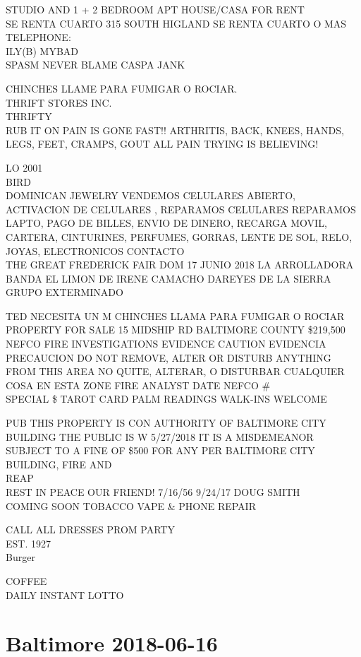 \documentclass[10pt,letterpaper]{article}
\begin{document}
STUDIO AND 1 + 2 BEDROOM APT HOUSE/CASA FOR RENT\\
SE RENTA CUARTO 315 SOUTH HIGLAND SE RENTA CUARTO O MAS TELEPHONE:\\
ILY(B) MYBAD\\
SPASM NEVER BLAME CASPA JANK

CHINCHES LLAME PARA FUMIGAR O ROCIAR.\\
THRIFT STORES INC.\\
THRIFTY\\
RUB IT ON PAIN IS GONE FAST!! ARTHRITIS, BACK, KNEES, HANDS, LEGS, FEET, CRAMPS, GOUT ALL PAIN TRYING IS BELIEVING!

LO 2001\\
BIRD\\
DOMINICAN JEWELRY VENDEMOS CELULARES ABIERTO, ACTIVACION DE CELULARES , REPARAMOS CELULARES REPARAMOS LAPTO, PAGO DE BILLES, ENVIO DE DINERO, RECARGA MOVIL, CARTERA, CINTURINES, PERFUMES, GORRAS, LENTE DE SOL, RELO, JOYAS, ELECTRONICOS CONTACTO\\
THE GREAT FREDERICK FAIR DOM 17 JUNIO 2018 LA ARROLLADORA BANDA EL LIMON DE IRENE CAMACHO DAREYES DE LA SIERRA GRUPO EXTERMINADO

TED NECESITA UN M CHINCHES LLAMA PARA FUMIGAR O ROCIAR\\
PROPERTY FOR SALE 15 MIDSHIP RD BALTIMORE COUNTY \$219,500\\
NEFCO FIRE INVESTIGATIONS EVIDENCE CAUTION EVIDENCIA PRECAUCION DO NOT REMOVE, ALTER OR DISTURB ANYTHING FROM THIS AREA NO QUITE, ALTERAR, O DISTURBAR CUALQUIER COSA EN ESTA ZONE FIRE ANALYST DATE NEFCO \#\\
SPECIAL \$ TAROT CARD PALM READINGS WALK{-}INS WELCOME

PUB THIS PROPERTY IS CON AUTHORITY OF BALTIMORE CITY BUILDING THE PUBLIC IS W 5/27/2018 IT IS A MISDEMEANOR SUBJECT TO A FINE OF \$500 FOR ANY PER BALTIMORE CITY BUILDING, FIRE AND\\
REAP\\
REST IN PEACE OUR FRIEND!  7/16/56 9/24/17 DOUG SMITH\\
COMING SOON TOBACCO VAPE \& PHONE REPAIR

CALL ALL DRESSES PROM PARTY\\
EST. 1927\\
Burger

COFFEE\\
DAILY INSTANT LOTTO


\section*{Baltimore 2018-06-16}
\end{document}
